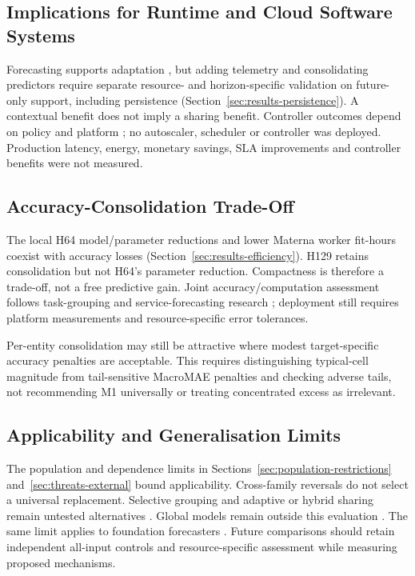 \documentclass[a4paper,fleqn]{cas-dc}
\begin{document}
\subsection{Implications for Runtime and Cloud Software Systems}
\label{sec:discussion-systems}

Forecasting supports adaptation \citep{Taherizadeh2018Monitoring,Bauer2020SelfAware},
but adding telemetry and consolidating predictors require separate resource-
and horizon-specific validation on future-only support, including persistence
(Section~\ref{sec:results-persistence}). A contextual benefit does not imply a
sharing benefit. Controller outcomes depend on policy and platform
\citep{Qu2018Autoscaling}; no autoscaler, scheduler or controller was deployed.
Production latency, energy, monetary savings, SLA improvements and controller
benefits were not measured.

\subsection{Accuracy-Consolidation Trade-Off}
\label{sec:discussion-efficiency}

The local H64 model/parameter reductions and lower Materna worker fit-hours
coexist with accuracy losses (Section~\ref{sec:results-efficiency}).
H129 retains consolidation but not H64's parameter reduction. Compactness is
therefore a trade-off, not a free predictive gain. Joint accuracy/computation
assessment follows task-grouping and service-forecasting research
\citep{Standley2020TaskGrouping,Syu2017DynamicQoS}; deployment still requires
platform measurements and resource-specific error tolerances.

Per-entity consolidation may still be attractive where modest target-specific
accuracy penalties are acceptable. This requires distinguishing typical-cell
magnitude from tail-sensitive MacroMAE penalties and checking adverse tails,
not recommending M1 universally or treating concentrated excess as irrelevant.

\subsection{Applicability and Generalisation Limits}
\label{sec:discussion-applicability}

The population and dependence limits in Sections~\ref{sec:population-restrictions}
and~\ref{sec:threats-external} bound applicability. Cross-family reversals do not
select a universal replacement. Selective grouping and adaptive or hybrid
sharing remain untested alternatives
\citep{Fifty2021TaskGroupings,Yu2020GradientSurgery,Nochumsohn2025MTLinear}.
Global models remain outside this evaluation
\citep{MonteroManso2021GlobalForecasting}.
The same limit applies to foundation forecasters
\citep{DiMenna2026RuntimeForecasting}. Future comparisons should retain
independent all-input controls and resource-specific assessment while
measuring proposed mechanisms.
\end{document}
